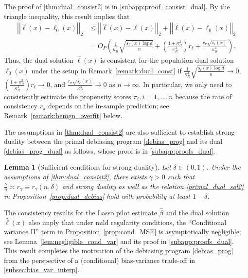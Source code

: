 \documentclass[ejsv2,noshowframe]{imsart}
\theoremstyle{plain}
\newtheorem{lemma}[theorem]{Lemma}
\theoremstyle{definition}
\theoremstyle{remark}
\newcommand{\norm}[1]{\left|\left| #1 \right|\right|}
\renewcommand{\hat}{\widehat}
\renewcommand{\tilde}{\widetilde}
\begin{document}
The proof of \autoref{thm:dual_consist2} is in \autoref{subapp:proof_consist_dual}. By the triangle inequality, this result implies that
\begin{align*}
	\norm{\hat{\ell}(x) - \ell_0(x)}_2 &\leq \norm{\hat{\ell}(x) - \tilde{\ell}(x)}_2 + \norm{\tilde{\ell}(x) - \ell_0(x)}_2 \\
	&= O_P\left(\frac{1}{\kappa_R^3} \sqrt{\frac{s_{\ell}(x)\log d}{n}} + \left(\frac{1+\kappa_R^2}{\kappa_R^4}\right) r_{\ell} + \frac{r_{\pi}\sqrt{s_{\ell}(x)}}{\kappa_R^4} \right).
\end{align*}
Thus, the dual solution $\hat{\ell}(x)$ is consistent for the population dual solution $\ell_0(x)$ under the setup in Remark~\ref{remark:dual_const} if $\frac{1}{\kappa_R^3}\sqrt{\frac{s_{\ell}(x)\log d}{n}} \to 0$, $\left(\frac{1+\kappa_R^2}{\kappa_R^4}\right) r_{\ell} \to 0$, and $\frac{r_{\pi}\sqrt{s_{\ell}(x)}}{\kappa_R^4} \to 0$ as $n\to \infty$. In particular, we only need to consistently estimate the propensity scores $\pi_i, i=1,...,n$ because the rate of consistency $r_{\pi}$ depends on the in-sample prediction; see Remark~\ref{remark:benign_overfit} below.

The assumptions in \autoref{thm:dual_consist2} are also sufficient to establish strong duality between the primal debiasing program \eqref{debias_prog} and its dual \eqref{debias_prog_dual} as follows, whose proof is in \autoref{subapp:proofs_dual}.

\begin{lemma}[Sufficient conditions for strong duality]
	\label{lem:strong_duality}
	Let $\delta \in (0,1)$. Under the assumptions of \autoref{thm:dual_consist2}, there exists $\gamma>0$ such that $\frac{\gamma}{n} \asymp r_{\gamma}\equiv r_{\gamma}(n,\delta)$ and strong duality as well as the relation \eqref{primal_dual_sol2} in Proposition~\ref{prop:dual_debias} hold with probability at least $1-\delta$.
\end{lemma}

The consistency results for the Lasso pilot estimate $\hat{\beta}$ and the dual solution $\hat{\ell}(x)$ also imply that under mild regularity conditions, the ``Conditional variance II'' term in Proposition~\ref{prop:cond_MSE} is asymptotically negligible; see Lemma~\ref{lem:negligible_cond_var} and its proof in \autoref{subapp:proofs_dual}. This result completes the motivation of the debiasing program \eqref{debias_prog} from the perspective of a (conditional) bias-variance trade-off in \autoref{subsec:bias_var_interp}.
\end{document}
